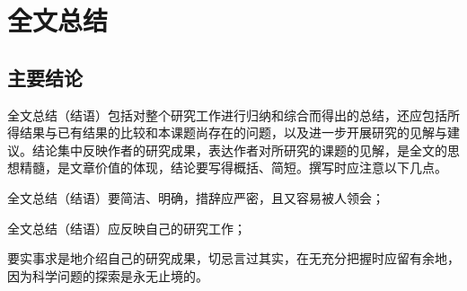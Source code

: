 
\chapter{全文总结}

\section{主要结论}
全文总结（结语）包括对整个研究工作进行归纳和综合而得出的总结，还应包括所得结果与已有结果的比较和本课题尚存在的问题，以及进一步开展研究的见解与建议。结论集中反映作者的研究成果，表达作者对所研究的课题的见解，是全文的思想精髓，是文章价值的体现，结论要写得概括、简短。撰写时应注意以下几点。
\begin{asparaenum}[1)]
	\item 全文总结（结语）要简洁、明确，措辞应严密，且又容易被人领会；
	\item 全文总结（结语）应反映自己的研究工作；
	\item  要实事求是地介绍自己的研究成果，切忌言过其实，在无充分把握时应留有余地，因为科学问题的探索是永无止境的。
\end{asparaenum}
